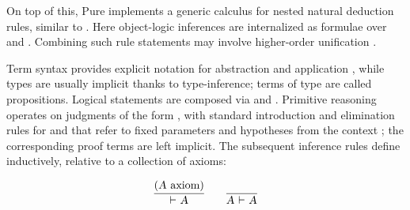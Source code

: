 \begin{isabellebody}
\begin{isamarkuptext}
  On top of this, Pure implements a generic calculus for nested
  natural deduction rules, similar to \cite{Schroeder-Heister:1984}.
  Here object-logic inferences are internalized as formulae over
  \isa{{\isachardoublequote}{\isasymAnd}{\isachardoublequote}} and \isa{{\isachardoublequote}{\isasymLongrightarrow}{\isachardoublequote}}.  Combining such rule statements may
  involve higher-order unification \cite{paulson-natural}.%
\end{isamarkuptext}%
\isamarkuptrue%
%
\isamarkuptrue%
%
\begin{isamarkuptext}%
Term syntax provides explicit notation for abstraction  and application , while types are usually
  implicit thanks to type-inference; terms of type  are
  called propositions.  Logical statements are composed via  and .  Primitive reasoning operates on
  judgments of the form \isa{{\isachardoublequote}{\isasymGamma}\ {\isasymturnstile}\ {\isasymphi}{\isachardoublequote}}, with standard introduction
  and elimination rules for \isa{{\isachardoublequote}{\isasymAnd}{\isachardoublequote}} and \isa{{\isachardoublequote}{\isasymLongrightarrow}{\isachardoublequote}} that refer to
  fixed parameters  and hypotheses
   from the context \isa{{\isachardoublequote}{\isasymGamma}{\isachardoublequote}};
  the corresponding proof terms are left implicit.  The subsequent
  inference rules define \isa{{\isachardoublequote}{\isasymGamma}\ {\isasymturnstile}\ {\isasymphi}{\isachardoublequote}} inductively, relative to a
  collection of axioms:

  \[
  \infer{\isa{{\isachardoublequote}{\isasymturnstile}\ A{\isachardoublequote}}}{(\isa{{\isachardoublequote}A{\isachardoublequote}} \text{~axiom})}
  \qquad
  \infer{\isa{{\isachardoublequote}A\ {\isasymturnstile}\ A{\isachardoublequote}}}{}
  \]


\end{isamarkuptext}
\end{isabellebody}
